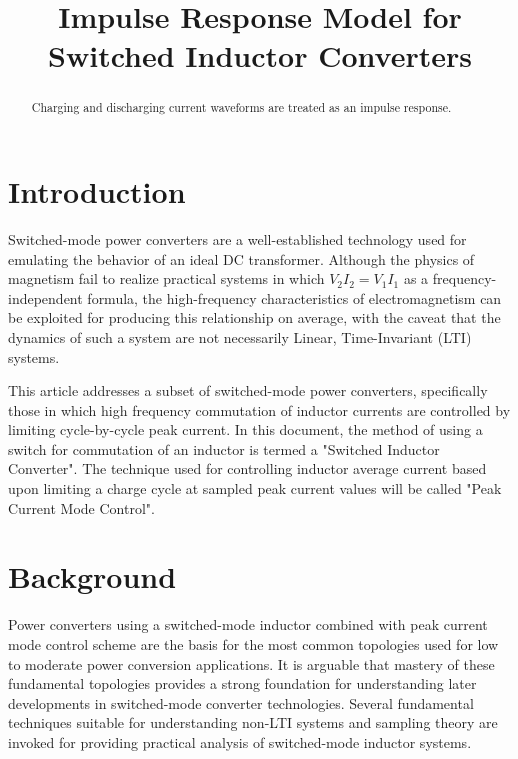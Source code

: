 \documentclass[conference]{IEEEtran}
\begin{document}
\title{Impulse Response Model for Switched Inductor Converters\\}

\author{
\and
{}
}


\maketitle

\begin{abstract}
Charging and discharging current waveforms are treated as an impulse response.
\end{abstract}


\section{Introduction}
Switched-mode power converters are a well-established technology used for emulating the behavior of an ideal DC transformer.  Although the physics of magnetism fail to realize practical systems in which $V_{2} I_{2} = V_{1} I_{1}$ as a frequency-independent formula, the high-frequency characteristics of electromagnetism can be exploited for producing this relationship on average, with the caveat that the dynamics of such a system are not necessarily Linear, Time-Invariant (LTI) systems.  

This article addresses a subset of switched-mode power converters, specifically those in which high frequency commutation of inductor currents are controlled by limiting cycle-by-cycle peak current.  In this document, the method of using a switch for commutation of an inductor is termed a "Switched Inductor Converter".  The technique used for controlling inductor average current based upon limiting a charge cycle at sampled peak current values will be called "Peak Current Mode Control".

\section{Background}

Power converters using a switched-mode inductor combined with peak current mode control scheme are the basis for the most common topologies used for low to moderate power conversion applications. It is arguable that mastery of these fundamental topologies provides a strong foundation for understanding later developments in switched-mode converter technologies. Several fundamental techniques suitable for understanding non-LTI systems and sampling theory are invoked for providing practical analysis of switched-mode inductor systems.
\end{document}
